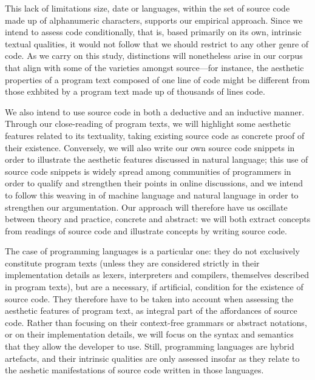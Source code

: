 This lack of limitations size, date or languages, within the set of source code made up of alphanumeric characters, supports our empirical approach. Since we intend to assess code conditionally, that is, based primarily on its own, intrinsic textual qualities, it would not follow that we should restrict to any other genre of code. As we carry on this study, distinctions will nonetheless arise in our corpus that align with some of the varieties amongst source—for instance, the aesthetic properties of a program text composed of one line of code might be different from those exhbited by a program text made up of thousands of lines code.

We also intend to use source code in both a deductive and an inductive manner. Through our close-reading of program texts, we will highlight some aesthetic features related to its textuality, taking existing source code as concrete proof of their existence. Conversely, we will also write our own source code snippets in order to illustrate the aesthetic features discussed in natural language; this use of source code snippets is widely spread among communities of programmers in order to qualify and strengthen their points in online discussions, and we intend to follow this weaving in of machine language and natural language in order to strengthen our argumentation. Our approach will therefore have us oscillate between theory and practice, concrete and abstract: we will both extract concepts from readings of source code and illustrate concepts by writing source code.

The case of programming languages is a particular one: they do not exclusively constitute program texts (unless they are considered strictly in their implementation details as lexers, interpreters and compilers, themselves described in program texts), but are a necessary, if artificial, condition for the existence of source code. They therefore have to be taken into account when assessing the aesthetic features of program text, as integral part of the affordances of source code. Rather than focusing on their context-free grammars or abstract notations, or on their implementation details, we will focus on the syntax and semantics that they allow the developer to use. Still, programming languages are hybrid artefacts, and their intrinsic qualities are only assessed insofar as they relate to the aeshetic manifestations of source code written in those languages.

